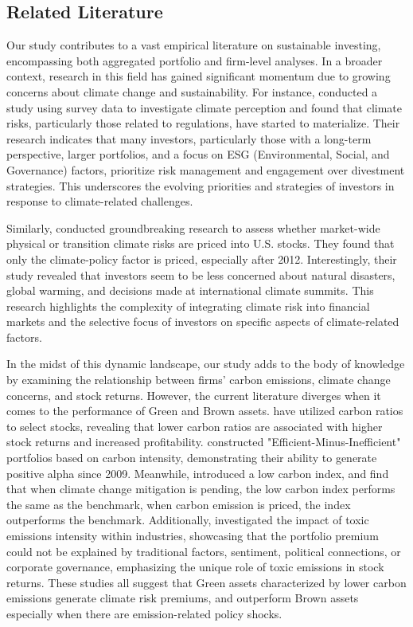 \documentclass[12pt]{article}
\begin{document}
\subsection*{Related Literature}

Our study contributes to a vast empirical literature on sustainable investing, encompassing both aggregated portfolio and firm-level analyses. In a broader context, research in this field has gained significant momentum due to growing concerns about climate change and sustainability. For instance, \cite{krueger2020importance} conducted a study using survey data to investigate climate perception and found that climate risks, particularly those related to regulations, have started to materialize. Their research indicates that many investors, particularly those with a long-term perspective, larger portfolios, and a focus on ESG (Environmental, Social, and Governance) factors, prioritize risk management and engagement over divestment strategies. This underscores the evolving priorities and strategies of investors in response to climate-related challenges. 

Similarly, \cite{faccini2023dissecting} conducted groundbreaking research to assess whether market-wide physical or transition climate risks are priced into U.S. stocks. They found that only the climate-policy factor is priced, especially after 2012. Interestingly, their study revealed that investors seem to be less concerned about natural disasters, global warming, and decisions made at international climate summits. This research highlights the complexity of integrating climate risk into financial markets and the selective focus of investors on specific aspects of climate-related factors. 
		
In the midst of this dynamic landscape, our study adds to the body of knowledge by examining the relationship between firms' carbon emissions, climate change concerns, and stock returns. However, the current literature diverges when it comes to the performance of Green and Brown assets.  \cite{garvey2018carbon} have utilized carbon ratios to select stocks, revealing that lower carbon ratios are associated with higher stock returns and increased profitability. \cite{in2017being} constructed "Efficient-Minus-Inefficient" portfolios based on carbon intensity, demonstrating their ability to generate positive alpha since 2009. Meanwhile, \cite{andersson2016hedging} introduced a low carbon index, and find that when climate change mitigation is pending, the low carbon index performs the same as the benchmark, when carbon emission is priced, the index outperforms the benchmark. Additionally, \cite{hsu2023pollution} investigated the impact of toxic emissions intensity within industries, showcasing that the portfolio premium could not be explained by traditional factors, sentiment, political connections, or corporate governance, emphasizing the unique role of toxic emissions in stock returns. These studies all suggest that Green assets characterized by lower carbon emissions generate climate risk premiums, and outperform Brown assets especially when there are emission-related policy shocks.
\end{document}
